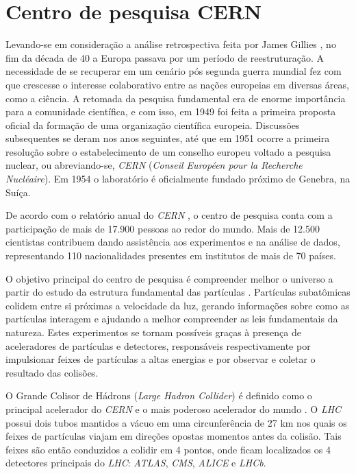 \section{Centro de pesquisa CERN}
Levando-se em consideração a análise retrospectiva feita por James Gillies \cite{gillies}, no fim da década de 40 a Europa passava por um período de reestruturação. A necessidade de se recuperar em um cenário pós segunda guerra mundial fez com que crescesse o interesse colaborativo entre as nações europeias em diversas áreas, como a ciência. A retomada da pesquisa fundamental era de enorme importância para a comunidade científica, e com isso, em 1949 foi feita a primeira proposta oficial da formação de uma organização científica europeia. Discussões subsequentes se deram nos anos seguintes, até que em 1951 ocorre a primeira resolução sobre o estabelecimento de um conselho europeu voltado a pesquisa nuclear, ou abreviando-se, \emph{CERN} (\emph{Conseil Européen pour la Recherche Nucléaire}). Em 1954 o laboratório é oficialmente fundado próximo de Genebra, na Suíça.

De acordo com o relatório anual do \emph{CERN} \cite{cernrelat}, o centro de pesquisa conta com a participação de mais de 17.900 pessoas ao redor do mundo. Mais de 12.500 cientistas contribuem dando assistência aos experimentos e na análise de dados, representando 110 nacionalidades presentes em institutos de mais de 70 países.

O objetivo principal do centro de pesquisa é compreender melhor o universo a partir do estudo da estrutura fundamental das partículas \cite{cernsiteabout}. Partículas subatômicas colidem entre si próximas a velocidade da luz, gerando informações sobre como as partículas interagem e ajudando a melhor compreender as leis fundamentais da natureza. Estes experimentos se tornam possíveis graças à presença de aceleradores de partículas e detectores, responsáveis respectivamente por impulsionar feixes de partículas a altas energias e por observar e coletar o resultado das colisões.

O Grande Colisor de Hádrons (\emph{Large Hadron Collider}) é definido como o principal acelerador do \emph{CERN} e o mais poderoso acelerador do mundo \cite{cernsiteabout} \cite{evans}. O \emph{LHC} possui dois tubos mantidos a vácuo em uma circunferência de 27 km nos quais os feixes de partículas viajam em direções opostas momentos antes da colisão. Tais feixes são então conduzidos a colidir em 4 pontos, onde ficam localizados os 4 detectores principais do \emph{LHC}: \emph{ATLAS}, \emph{CMS}, \emph{ALICE} e \emph{LHCb}.


